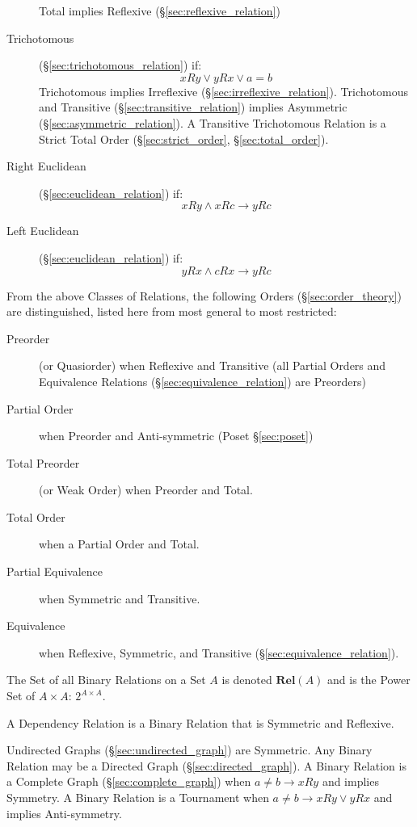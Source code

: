 \begin{description}
\[  \]
  Total implies Reflexive (\S\ref{sec:reflexive_relation})
\item[Trichotomous] (\S\ref{sec:trichotomous_relation}) if:
  \[
    xRy \vee yRx \vee a = b
  \]
  Trichotomous implies Irreflexive (\S\ref{sec:irreflexive_relation}).
  Trichotomous and Transitive (\S\ref{sec:transitive_relation})
  implies Asymmetric (\S\ref{sec:asymmetric_relation}). A Transitive
  Trichotomous Relation is a Strict Total Order
  (\S\ref{sec:strict_order}, \S\ref{sec:total_order}).
\item[Right Euclidean] (\S\ref{sec:euclidean_relation}) if:
  \[
    xRy \wedge xRc \rightarrow yRc
  \]
\item[Left Euclidean] (\S\ref{sec:euclidean_relation}) if:
  \[
    yRx \wedge cRx \rightarrow yRc
  \]
\end{description}
From the above Classes of Relations, the following Orders
(\S\ref{sec:order_theory}) are distinguished, listed here from most
general to most restricted:
\begin{description}
\item[Preorder] (or Quasiorder) when Reflexive and Transitive (all
  Partial Orders and Equivalence Relations
  (\S\ref{sec:equivalence_relation}) are Preorders)
\item[Partial Order] when Preorder and Anti-symmetric (Poset
  \S\ref{sec:poset})
\item[Total Preorder] (or Weak Order) when Preorder and Total.
\item[Total Order] when a Partial Order and Total.
\item[Partial Equivalence] when Symmetric and Transitive.
\item[Equivalence] when Reflexive, Symmetric, and Transitive
  (\S\ref{sec:equivalence_relation}).
\end{description}

The Set of all Binary Relations on a Set $A$ is denoted
$\mathbf{Rel}(A)$ and is the Power Set of $A \times A$: $2^{A \times
  A}$.

A Dependency Relation is a Binary Relation that is Symmetric and
Reflexive.

Undirected Graphs (\S\ref{sec:undirected_graph}) are Symmetric. Any
Binary Relation may be a Directed Graph (\S\ref{sec:directed_graph}).
A Binary Relation is a Complete Graph (\S\ref{sec:complete_graph})
when $a \neq b \rightarrow xRy$ and implies Symmetry. A Binary
Relation is a Tournament when $a \neq b \rightarrow xRy \vee yRx$ and
implies Anti-symmetry.



